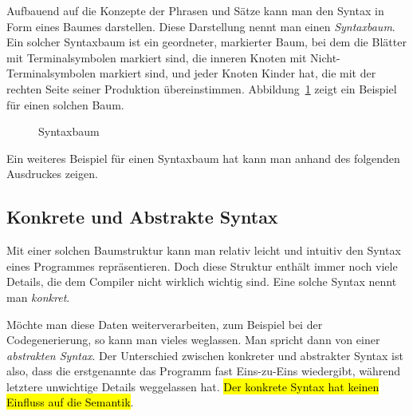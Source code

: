 \documentclass[
  ngerman,
  DIV=12
]{scrartcl}
\begin{document}
Aufbauend auf die Konzepte der Phrasen und Sätze kann man den Syntax in Form eines Baumes darstellen. Diese Darstellung nennt man einen \emph{Syntaxbaum}. Ein solcher Syntaxbaum ist ein geordneter, markierter Baum, bei dem die Blätter mit Terminalsymbolen markiert sind, die inneren Knoten mit Nicht-Terminalsymbolen markiert sind, und jeder Knoten Kinder hat, die mit der rechten Seite seiner Produktion übereinstimmen. Abbildung~\ref{fig:syntaxtree} zeigt ein Beispiel für einen solchen Baum.

\begin{figure}[!tbp]\centering
{}
\caption{Syntaxbaum}\label{fig:syntaxtree}
\end{figure}

Ein weiteres Beispiel für einen Syntaxbaum hat kann man anhand des folgenden Ausdruckes zeigen.




\subsection{Konkrete und Abstrakte Syntax}

Mit einer solchen Baumstruktur kann man relativ leicht und intuitiv den Syntax eines Programmes repräsentieren. Doch diese Struktur enthält immer noch viele Details, die dem Compiler nicht wirklich wichtig sind. Eine solche Syntax nennt man \emph{konkret}.

Möchte man diese Daten weiterverarbeiten, zum Beispiel bei der Codegenerierung, so kann man vieles weglassen. Man spricht dann von einer \emph{abstrakten Syntax}. Der Unterschied zwischen konkreter und abstrakter Syntax ist also, dass die erstgenannte das Programm fast Eins-zu-Eins wiedergibt, während letztere unwichtige Details weggelassen hat. \hl{Der konkrete Syntax hat keinen Einfluss auf die Semantik}. 

\end{document}
